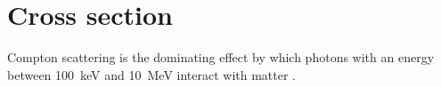 
\section{Cross section}
\label{sec:compton-cross-section}

Compton scattering is the dominating effect by which photons with an energy between
\SI{100}{\kilo\electronvolt} and \SI{10}{\mega\electronvolt} interact with matter
\cite{damashek1970forward}.

